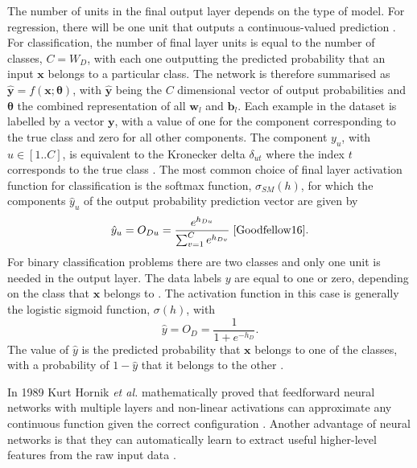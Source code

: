 \documentclass[12pt]{article}
\begin{document}
The number of units in the final output layer depends on the type of model. For regression, there will be one unit that outputs a continuous-valued prediction \cite{Goodfellow16}. For classification, the number of final layer units is equal to the number of classes, $C=W_D$, with each one outputting the predicted probability that an input $\bm{x}$ belongs to a particular class. The network is therefore summarised as $\hat{\bm{y}}=f(\bm{x};\bm\theta)$, with $\hat{\bm{y}}$ being the $C$ dimensional vector of output probabilities and $\bm\theta$ the combined representation of all $\bm{w}_l$ and $\bm{b}_l$. Each example in the dataset is labelled by a vector $\bm{y}$, with a value of one for the component corresponding to the true class and zero for all other components. The component $y_u$, with $u\in[1..C]$, is equivalent to the Kronecker delta $\delta_{ut}$ where the index $t$ corresponds to the true class \cite{Goodfellow16}. The most common choice of final layer activation function for classification is the softmax function, $\sigma_{SM}(h)$, for which the components $\hat{y}_u$ of the output probability prediction vector are given by
\begin{equation}
\hat{y}_u=O_{Du}=\frac{e^{h_{Du}}}{\sum_{v=1}^{C}e^{h_{Dv}}}\;\cite{Goodfellow16}.
\end{equation} 
For binary classification problems there are two classes and only one unit is needed in the output layer. The data labels $y$ are equal to one or zero, depending on the class that $\bm{x}$ belongs to \cite{Goodfellow16}. The activation function in this case is generally the logistic sigmoid function, $\sigma(h)$, with
\begin{equation}
\hat{y}=O_D=\frac{1}{1+e^{-h_D}}.
\end{equation}
The value of $\hat{y}$ is the predicted probability that $\bm{x}$ belongs to one of the classes, with a probability of $1-\hat{y}$ that it belongs to the other \cite{Goodfellow16}. 

In 1989 Kurt Hornik \textit{et al.} mathematically proved that feedforward neural networks with multiple layers and non-linear activations can approximate any continuous function given the correct configuration \cite{Hornik89}. Another advantage of neural networks is that they can automatically learn to extract useful higher-level features from the raw input data \cite{Haykin98}.
\end{document}

